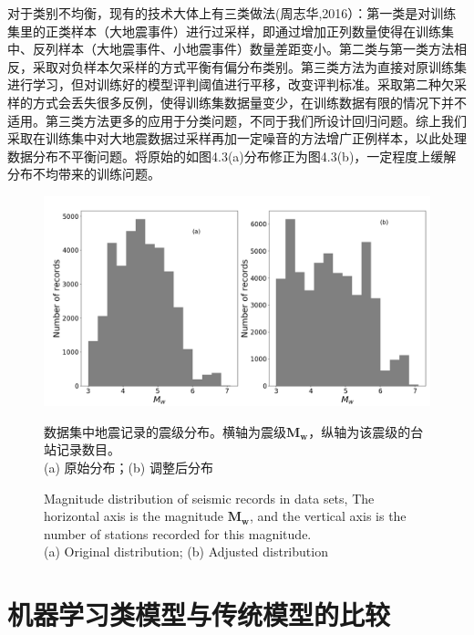 \indent 对于类别不均衡，现有的技术大体上有三类做法(周志华,2016）：第一类是对训练集里的正类样本（大地震事件）进行过采样，即通过增加正列数量使得在训练集中、反列样本（大地震事件、小地震事件）数量差距变小。第二类与第一类方法相反，采取对负样本欠采样的方式平衡有偏分布类别。第三类方法为直接对原训练集进行学习，但对训练好的模型评判阈值进行平移，改变评判标准。采取第二种欠采样的方式会丢失很多反例，使得训练集数据量变少，在训练数据有限的情况下并不适用。第三类方法更多的应用于分类问题，不同于我们所设计回归问题。综上我们采取在训练集中对大地震数据过采样再加一定噪音的方法增广正例样本，以此处理数据分布不平衡问题。将原始的如图4.3(a)分布修正为图4.3(b)，一定程度上缓解分布不均带来的训练问题。\\
\begin{figure}[!h] 
\centering 
 \includegraphics[width=0.95\linewidth]{img/event_dist.png} 
 \renewcommand{\figurename}{图} 
\caption{数据集中地震记录的震级分布。横轴为震级$\mathbf{M}_{\mathbf{w}}$，纵轴为该震级的台站记录数目。\\
(a) 原始分布；(b) 调整后分布} 
\addtocounter{figure}{-1} \vspace{-5pt} 
\renewcommand{\figurename}{Fig} 
\caption{Magnitude distribution of seismic records in data sets, The horizontal axis is the magnitude $\mathbf{M}_{\mathbf{w}}$, and the vertical axis is the number of stations recorded for this magnitude.\\
(a) Original distribution; (b) Adjusted distribution} 
\renewcommand{\figurename}{图} 
\label{fig:network-device-influence.png} 
\end{figure}


\section{机器学习类模型与传统模型的比较}
